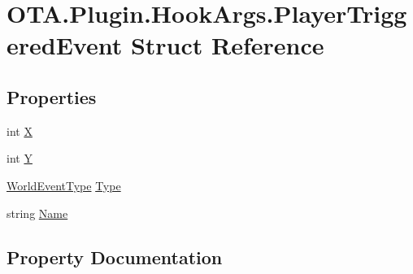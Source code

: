 \hypertarget{struct_o_t_a_1_1_plugin_1_1_hook_args_1_1_player_triggered_event}{}\section{O\+T\+A.\+Plugin.\+Hook\+Args.\+Player\+Triggered\+Event Struct Reference}
\label{struct_o_t_a_1_1_plugin_1_1_hook_args_1_1_player_triggered_event}
\subsection*{Properties}
\begin{DoxyCompactItemize}
\item 
int \hyperlink{struct_o_t_a_1_1_plugin_1_1_hook_args_1_1_player_triggered_event_aa901d9736389c96ae123646ab96a0030}{X}
\item 
int \hyperlink{struct_o_t_a_1_1_plugin_1_1_hook_args_1_1_player_triggered_event_ad1a1ac56965245076ba84ab3a1f1b566}{Y}
\item 
\hyperlink{namespace_o_t_a_1_1_plugin_a3eb70ca411b811f05acf9eaf7a270f53}{World\+Event\+Type} \hyperlink{struct_o_t_a_1_1_plugin_1_1_hook_args_1_1_player_triggered_event_af071d976f2b4abed8491eca7bfddf7cd}{Type}
\item 
string \hyperlink{struct_o_t_a_1_1_plugin_1_1_hook_args_1_1_player_triggered_event_afbc27e30bede6dda86bde883a708df3b}{Name}
\end{DoxyCompactItemize}


\subsection{Property Documentation}
\hypertarget{struct_o_t_a_1_1_plugin_1_1_hook_args_1_1_player_triggered_event_afbc27e30bede6dda86bde883a708df3b}{}
